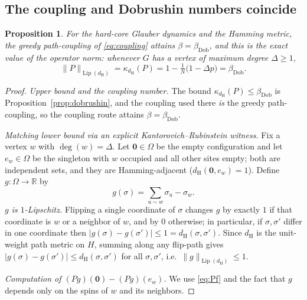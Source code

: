 \documentclass{amsart}
\newtheorem{proposition}{Proposition}
\DeclareMathOperator{\Lip}{Lip}
\newcommand{\Om}{\Omega}
\newcommand{\R}{\mathbb{R}}
\begin{document}
\subsection{The coupling and Dobrushin numbers coincide}
\begin{proposition}\label{prop:equal}
For the hard-core Glauber dynamics and the Hamming metric, the greedy
path-coupling of \eqref{eq:coupling} attains $\beta=\beta_{\mathrm{Dob}}$, and
this is the \emph{exact} value of the operator norm: whenever $G$ has a vertex of
maximum degree $\Delta\ge1$,
\[
\|P\|_{\Lip(d_{\mathrm H})}=\kappa_{d_{\mathrm H}}(P)
=1-\tfrac1N\big(1-\Delta p\big)=\beta_{\mathrm{Dob}} .
\]
\end{proposition}
\begin{proof}
\emph{Upper bound and the coupling number.} The bound
$\kappa_{d_{\mathrm H}}(P)\le\beta_{\mathrm{Dob}}$ is
Proposition~\ref{prop:dobrushin}, and the coupling used there \emph{is} the
greedy path-coupling, so the coupling route attains $\beta=\beta_{\mathrm{Dob}}$.

\smallskip
\emph{Matching lower bound via an explicit Kantorovich--Rubinstein witness.}
Fix a vertex $w$ with $\deg(w)=\Delta$. Let $\mathbf 0\in\Om$ be the empty
configuration and let $e_w\in\Om$ be the singleton with $w$ occupied and all
other sites empty; both are independent sets, and they are Hamming-adjacent
($d_{\mathrm H}(\mathbf 0,e_w)=1$). Define $g:\Om\to\R$ by
\begin{equation}\label{eq:witness}
g(\sigma)=\sum_{u\sim w}\sigma_u-\sigma_w .
\end{equation}
\emph{$g$ is $1$-Lipschitz.} Flipping a single coordinate of $\sigma$ changes
$g$ by exactly $1$ if that coordinate is $w$ or a neighbor of $w$, and by $0$
otherwise; in particular, if $\sigma,\sigma'$ differ in one coordinate then
$|g(\sigma)-g(\sigma')|\le1=d_{\mathrm H}(\sigma,\sigma')$. Since $d_{\mathrm H}$
is the unit-weight path metric on $H$, summing along any flip-path gives
$|g(\sigma)-g(\sigma')|\le d_{\mathrm H}(\sigma,\sigma')$ for all
$\sigma,\sigma'$, i.e.\ $\|g\|_{\Lip(d_{\mathrm H})}\le1$.

\emph{Computation of $(Pg)(\mathbf 0)-(Pg)(e_w)$.} We use \eqref{eq:Pf} and the
fact that $g$ depends only on the spins of $w$ and its neighbors.


\end{proof}
\end{document}
